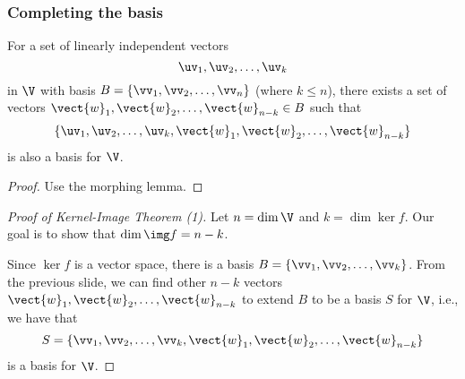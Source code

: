 \begin{frame}
  \frametitle{Completing the basis}
  
  \begin{lemma}
    For a set of linearly independent vectors
    \[
    \uv_1,\uv_2,\ldots,\uv_k
    \]
    in $\V$ with basis $B=\{\vv_1,\vv_2,\ldots,\vv_n\}$
    (where $k\leq n$), there exists a set of vectors
    $\vect{w}_1,\vect{w}_2,\ldots,\vect{w}_{n-k}\in B$ such
    that
    \[
    \{
    \uv_1,\uv_2,\ldots,\uv_k,
    \vect{w}_1,\vect{w}_2,\ldots,\vect{w}_{n-k}
    \}
    \]
    is also a basis for $\V$.
  \end{lemma}

  \pause

  \begin{proof}
    Use the morphing lemma.
  \end{proof}
\end{frame}

\begin{frame}
\begin{proof}[Proof of Kernel-Image Theorem (1)]
  Let $n=\dim\V$ and $k=\dim\ker f$.  Our goal is to show that
  $\dim\img f=n-k$.

  Since $\ker f$ is a vector space, there is a basis
  $B=\{\vv_1,\vv_2,\ldots,\vv_k\}$.  From the previous slide, we can
  find other $n-k$ vectors
  $\vect{w}_1,\vect{w}_2,\ldots,\vect{w}_{n-k}$ to extend $B$ to be a
  basis $S$ for $\V$, i.e., we have that
  \[
  S =
  \{\vv_1,\vv_2,\ldots,\vv_k,\vect{w}_1,\vect{w}_2,\ldots,\vect{w}_{n-k}\}
  \]
  is a basis for $\V$.
\end{proof}
\end{frame}

